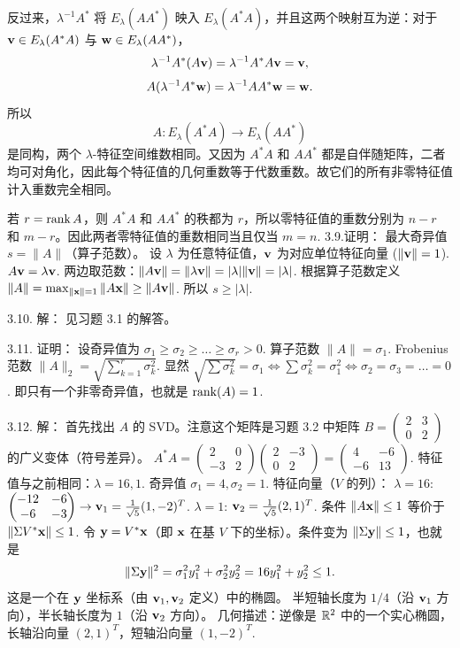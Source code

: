 \begin{exer}
反过来，$\lambda^{-1}A^*$ 将 $E_\lambda(AA^*)$ 映入 $E_\lambda(A^*A)$，并且这两个映射互为逆：对于 $\mathbf{v}\in E_\lambda(A^*A)$ 与 $\mathbf{w}\in E_\lambda(AA^*)$，
$$\lambda^{-1}A^*(A\mathbf{v})=\lambda^{-1}A^*A\mathbf{v}=\mathbf{v},$$
$$A(\lambda^{-1}A^*\mathbf{w})=\lambda^{-1}AA^*\mathbf{w}=\mathbf{w}.$$
所以
$$A:E_\lambda(A^*A)\longrightarrow E_\lambda(AA^*)$$
是同构，两个 $\lambda$-特征空间维数相同。又因为 $A^*A$ 和 $AA^*$ 都是自伴随矩阵，二者均可对角化，因此每个特征值的几何重数等于代数重数。故它们的所有非零特征值计入重数完全相同。

若 $r=\operatorname{rank} A$，则 $A^*A$ 和 $AA^*$ 的秩都为 $r$，所以零特征值的重数分别为 $n-r$ 和 $m-r$。因此两者零特征值的重数相同当且仅当 $m=n$.
3.9.证明：
最大奇异值 $s = \|A\|$（算子范数）。
设 $\lambda$ 为任意特征值，$\mathbf{v}$ 为对应单位特征向量 ($\|\mathbf{v}\|=1$).
$A\mathbf{v} = \lambda \mathbf{v}$.
两边取范数：$\|A\mathbf{v}\| = \|\lambda \mathbf{v}\| = |\lambda| \|\mathbf{v}\| = |\lambda|$.
根据算子范数定义 $\|A\| = \max_{\|\mathbf{x}\|=1} \|A\mathbf{x}\| \ge \|A\mathbf{v}\|$.
所以 $s \ge |\lambda|$.

3.10. 解：
见习题 3.1 的解答。

3.11. 证明：
设奇异值为 $\sigma_1 \ge \sigma_2 \ge \dots \ge \sigma_r > 0$.
算子范数 $\|A\| = \sigma_1$.
Frobenius 范数 $\|A\|_2 = \sqrt{\sum_{k=1}^r \sigma_k^2}$.
显然 $\sqrt{\sum \sigma_k^2} = \sigma_1 \iff \sum \sigma_k^2 = \sigma_1^2 \iff \sigma_2 = \sigma_3 = \dots = 0$.
即只有一个非零奇异值，也就是 $\operatorname{rank}(A) = 1$.

3.12. 解：
首先找出 $A$ 的 SVD。注意这个矩阵是习题 3.2 中矩阵 $B = \begin{pmatrix} 2 & 3 \\ 0 & 2 \end{pmatrix}$ 的广义变体（符号差异）。
$A^*A = \begin{pmatrix} 2 & 0 \\ -3 & 2 \end{pmatrix} \begin{pmatrix} 2 & -3 \\ 0 & 2 \end{pmatrix} = \begin{pmatrix} 4 & -6 \\ -6 & 13 \end{pmatrix}$.
特征值与之前相同：$\lambda=16, 1$. 奇异值 $\sigma_1=4, \sigma_2=1$.
特征向量（$V$ 的列）：
$\lambda=16$: $\begin{pmatrix} -12 & -6 \\ -6 & -3 \end{pmatrix} \to \mathbf{v}_1 = \frac{1}{\sqrt{5}}(1, -2)^T$.
$\lambda=1$: $\mathbf{v}_2 = \frac{1}{\sqrt{5}}(2, 1)^T$.
条件 $\|A\mathbf{x}\| \le 1$ 等价于 $\| \Sigma V^* \mathbf{x} \| \le 1$.
令 $\mathbf{y} = V^* \mathbf{x}$（即 $\mathbf{x}$ 在基 $V$ 下的坐标）。条件变为 $\|\Sigma \mathbf{y}\| \le 1$，也就是
$$\|\Sigma\mathbf{y}\|^2=\sigma_1^2y_1^2+\sigma_2^2y_2^2=16y_1^2+y_2^2\le1.$$
这是一个在 $\mathbf{y}$ 坐标系（由 $\mathbf{v}_1, \mathbf{v}_2$ 定义）中的椭圆。
半短轴长度为 $1/4$（沿 $\mathbf{v}_1$ 方向），半长轴长度为 $1$（沿 $\mathbf{v}_2$ 方向）。
几何描述：逆像是 $\mathbb{R}^2$ 中的一个实心椭圆，长轴沿向量 $(2, 1)^T$，短轴沿向量 $(1, -2)^T$.


\end{exer}
